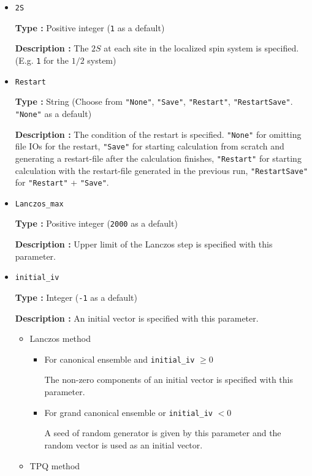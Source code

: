 \begin{itemize}
\item \verb|2S|

{\bf Type :} Positive integer (\verb|1| as a default)

{\bf Description :} The $2 S$ at each site in the localized spin system is specified.
(E.g. \verb|1| for the $1/2$ system)

\item \verb|Restart|

  {\bf Type :} String (Choose from \verb|"None"|, \verb|"Save"|, \verb|"Restart"|,  
  \verb|"RestartSave"|. \verb|"None"| as a default)

  {\bf Description :} The condition of the restart is specified.
  \verb|"None"| for omitting file IOs for the restart,
  \verb|"Save"| for starting calculation from scratch
  and generating a restart-file after the calculation finishes,
  \verb|"Restart"| for starting calculation with the
  restart-file generated in the previous run,
  \verb|"RestartSave"| for \verb|"Restart"| + \verb|"Save"|.

\item \verb|Lanczos_max|

{\bf Type :} Positive integer (\verb|2000| as a default)

{\bf Description :} Upper limit of the Lanczos step is specified with this parameter.

\item \verb|initial_iv|

{\bf Type :} Integer (\verb|-1| as a default)

{\bf Description :} 
{An initial vector is specified with this parameter.}
\begin{itemize}
\item{Lanczos method}
\begin{itemize}
\item{For canonical ensemble and \verb|initial_iv| $\geq 0$}

The non-zero components of an initial vector is specified with this parameter. 

\item{For grand canonical ensemble or \verb|initial_iv| $< 0$}

A seed of random generator is given by this parameter and the random vector is used as an initial vector.
\end{itemize}

\item{TPQ method}


\end{itemize}
\end{itemize}
